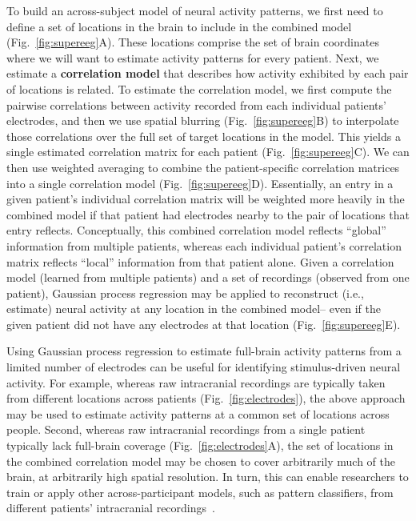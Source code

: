 \documentclass{llmxive}
\begin{document}
To build an across-subject model of neural activity patterns, we first
need to define a set of locations in the brain to include in the
combined model (Fig.~\ref{fig:supereeg}A).  These locations comprise
the set of brain coordinates where we will want to estimate activity
patterns for every patient.  Next, we estimate a \textbf{correlation
  model} that describes how activity exhibited by each pair of
locations is related.  To estimate the correlation model, we first
compute the pairwise correlations between activity recorded from each
individual patients' electrodes, and then we use spatial blurring
(Fig.~\ref{fig:supereeg}B) to interpolate those correlations over the
full set of target locations in the model.  This yields a single
estimated correlation matrix for each patient
(Fig.~\ref{fig:supereeg}C).  We can then use weighted averaging to
combine the patient-specific correlation matrices into a single
correlation model (Fig.~\ref{fig:supereeg}D).  Essentially, an entry
in a given patient's individual correlation matrix will be weighted
more heavily in the combined model if that patient had electrodes
nearby to the pair of locations that entry reflects.  Conceptually,
this combined correlation model reflects ``global'' information from
multiple patients, whereas each individual patient's correlation
matrix reflects ``local'' information from that patient alone.  Given
a correlation model (learned from multiple patients) and a set of
recordings (observed from one patient), Gaussian process regression
may be applied to reconstruct (i.e., estimate) neural activity at any
location in the combined model-- even if the given patient did not
have any electrodes at that location (Fig.~\ref{fig:supereeg}E).

Using Gaussian process regression to estimate full-brain activity
patterns from a limited number of electrodes can be useful for
identifying stimulus-driven neural activity.  For example, whereas raw
intracranial recordings are typically taken from different locations
across patients (Fig.~\ref{fig:electrodes}), the above approach may be
used to estimate activity patterns at a common set of locations across
people.  Second, whereas raw intracranial recordings from a single
patient typically lack full-brain coverage
(Fig.~\ref{fig:electrodes}A), the set of locations in the combined
correlation model may be chosen to cover arbitrarily much of the
brain, at arbitrarily high spatial resolution.  In turn, this can
enable researchers to train or apply other across-participant models,
such as pattern classifiers, from different patients' intracranial
recordings~\citep{ScanEtal21}.
\end{document}
